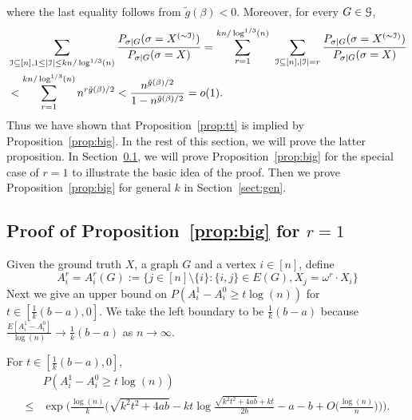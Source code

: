 \documentclass{article}
\begin{document}
where the last equality follows from $\tilde{g}(\beta)<0$. Moreover, for every $G\in\mathcal{G}$,
\begin{align*}
& \sum_{\mathcal{I}\subseteq[n],1\le |\mathcal{I}|\le kn/\log^{1/3}(n)}
\frac{P_{\sigma|G}(\sigma=X^{(\sim\mathcal{I})})}{P_{\sigma|G}(\sigma=X)} =
\sum_{r=1}^{kn/\log^{1/3}(n)}
\hspace*{0.05in}
\sum_{\mathcal{I}\subseteq[n],|\mathcal{I}|=r}
\frac{P_{\sigma|G}(\sigma=X^{(\sim \mathcal{I})} )}
{P_{\sigma|G}(\sigma=X)}  \\
& < \sum_{r=1}^{kn/\log^{1/3}(n)}
n^{r \tilde{g}(\beta) /2}
< \frac{n^{\tilde{g}(\beta)/2}}{1-n^{\tilde{g}(\beta)/2}} =o(1) .
\end{align*}
Thus we have shown that Proposition~\ref{prop:tt} is implied by Proposition~\ref{prop:big}. In the rest of this section, we will prove the latter proposition. In Section~\ref{sect:k=1}, we will prove Proposition~\ref{prop:big} for the special case of $r=1$ to illustrate the basic idea of the proof. Then we prove Proposition~\ref{prop:big} for general $k$ in Section~\ref{sect:gen}.


\subsection{Proof of Proposition~\ref{prop:big} for $r=1$} \label{sect:k=1}

Given the ground truth $X$, a graph $G$ and a vertex $i\in[n]$, define
\begin{equation} \label{eq:defAB}
A^r_i=A^r_i(G):=\{j\in[n]\setminus\{i\}:\{i,j\}\in E(G), X_j= \omega^r \cdot X_i\} 
\end{equation}
Next we give an upper bound on $P(A^1_i-A^0_i\ge t\log(n))$ for $t\in [\frac{1}{k}(b-a), 0]$. We take the left boundary to be $\frac{1}{k}(b-a)$ because $\frac{E[A^1_i-A^0_i]}{\log(n)}\to\frac{1}{k}(b-a)$ as $n\to\infty$.
\begin{proposition}  \label{prop:cher}
For $t\in [\frac{1}{k}(b-a), 0]$,
\begin{equation} \label{eq:upba}
\begin{aligned}
& P(A^1_i-A^0_i\ge t\log(n))  \\
\le &  \exp\Big(\frac{\log(n)}{k}
\Big(\sqrt{k^2t^2+4ab} -kt\log\frac{\sqrt{k^2t^2+4ab}+kt}{2b} -a-b + O\big(\frac{\log(n)}{n}\big) \Big)\Big) .
\end{aligned}
\end{equation}
\end{proposition}
\end{document}
